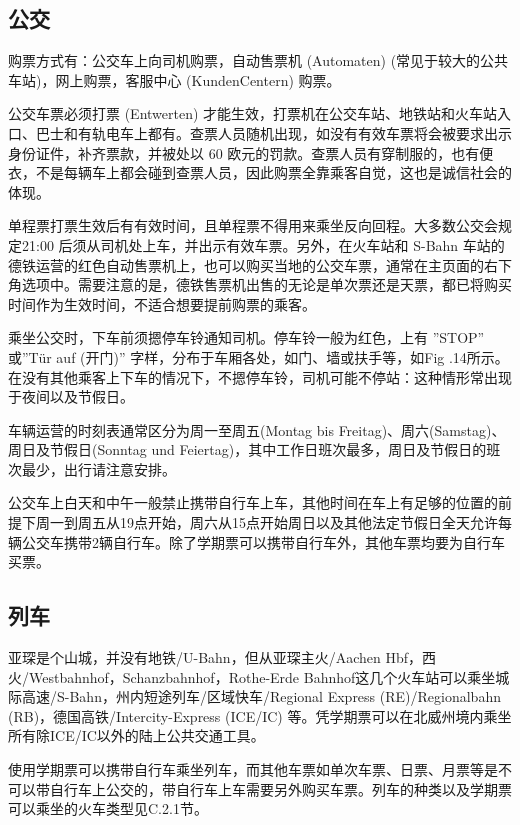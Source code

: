   \subsection{公交}\label{subsec:公交}

    购票方式有：公交车上向司机购票，自动售票机 (Automaten) (常见于较大的公共车站)，网上购票，客服中心 (KundenCentern) 购票。

    公交车票必须打票 (Entwerten) 才能生效，打票机在公交车站、地铁站和火车站入口、巴士和有轨电车上都有。查票人员随机出现，如没有有效车票将会被要求出示身份证件，补齐票款，并被处以 60 欧元的罚款。查票人员有穿制服的，也有便衣，不是每辆车上都会碰到查票人员，因此购票全靠乘客自觉，这也是诚信社会的体现。 

    单程票打票生效后有有效时间，且单程票不得用来乘坐反向回程。大多数公交会规定21:00 后须从司机处上车，并出示有效车票。另外，在火车站和 S-Bahn 车站的德铁运营的红色自动售票机上，也可以购买当地的公交车票，通常在主页面的右下角选项中。需要注意的是，德铁售票机出售的无论是单次票还是天票，都已将购买时间作为生效时间，不适合想要提前购票的乘客。

    乘坐公交时，下车前须摁停车铃通知司机。停车铃一般为红色，上有 ”STOP” 或”Tür auf (开门)” 字样，分布于车厢各处，如门、墙或扶手等，如Fig .14所示。在没有其他乘客上下车的情况下，不摁停车铃，司机可能不停站：这种情形常出现于夜间以及节假日。

    车辆运营的时刻表通常区分为周一至周五(Montag bis Freitag)、周六(Samstag)、周日及节假日(Sonntag und Feiertag)，其中工作日班次最多，周日及节假日的班次最少，出行请注意安排。

    公交车上白天和中午一般禁止携带自行车上车，其他时间在车上有足够的位置的前提下周一到周五从19点开始，周六从15点开始周日以及其他法定节假日全天允许每辆公交车携带2辆自行车。除了学期票可以携带自行车外，其他车票均要为自行车买票。

  \subsection{列车}\label{subsec:列车}

    亚琛是个山城，并没有地铁/U-Bahn，但从亚琛主火/Aachen Hbf，西火/Westbahnhof，Schanzbahnhof，Rothe-Erde Bahnhof这几个火车站可以乘坐城际高速/S-Bahn，州内短途列车/区域快车/Regional Express (RE)/Regionalbahn (RB)，德国高铁/Intercity-Express (ICE/IC) 等。凭学期票可以在北威州境内乘坐所有除ICE/IC以外的陆上公共交通工具。

    使用学期票可以携带自行车乘坐列车，而其他车票如单次车票、日票、月票等是不可以带自行车上公交的，带自行车上车需要另外购买车票。列车的种类以及学期票可以乘坐的火车类型见C.2.1节。

